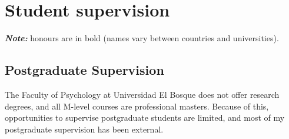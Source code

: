 \documentclass[11pt, a4paper]{awesome-cv}
\begin{document}
\endgroup

\hypertarget{student-supervision}{%
\section{Student supervision}\label{student-supervision}}

\textbf{\emph{Note:}} honours are in bold (names vary between countries
and universities).

\hypertarget{section-5}{%
\subsection{\texorpdfstring{\textbf{Postgraduate Supervision}}{}}\label{section-5}}

The Faculty of Psychology at Universidad El Bosque does not offer
research degrees, and all M-level courses are professional masters.
Because of this, opportunities to supervise postgraduate students are
limited, and most of my postgraduate supervision has been external.
\end{document}
